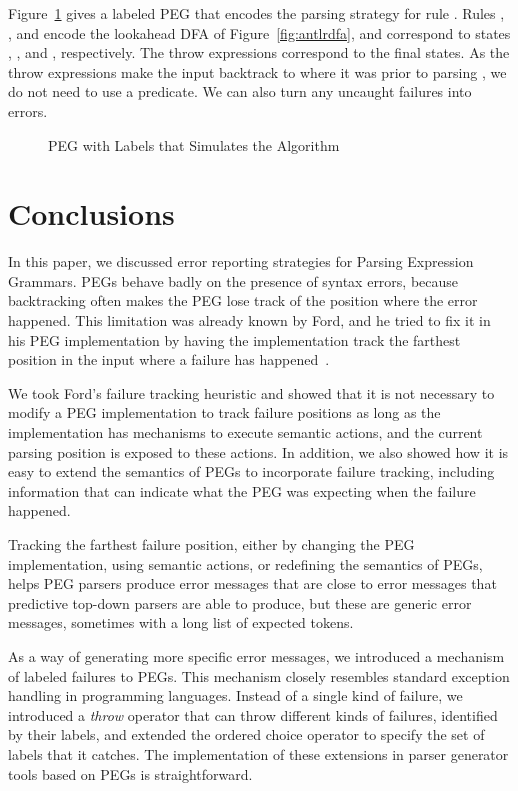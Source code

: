 \documentclass[3p,12pt,singlecolumn]{elsarticle}
\begin{document}
Figure~\ref{fig:pegllstar} gives a labeled PEG that encodes
the  parsing strategy for rule . Rules ,
, and  encode the lookahead DFA of Figure~\ref{fig:antlrdfa}, and correspond to states
, , and , respectively. The throw
expressions correspond to the final states.
As the throw expressions make the input backtrack to where
it was prior to parsing , we do not need to use a
predicate. We can also turn any uncaught failures into
errors.

\begin{figure}[t]

\caption{PEG with Labels that Simulates the  Algorithm}
\label{fig:pegllstar}
\end{figure}



\section{Conclusions} 
\label{sec:conc}

In this paper, we discussed error reporting strategies for
Parsing Expression Grammars. PEGs behave badly on the presence
of syntax errors, because backtracking often makes the PEG
lose track of the position where the error happened.
This limitation was already known by Ford, and he
tried to fix it in his PEG implementation by having
the implementation track the farthest position in the
input where a failure has happened~\cite{ford2002packrat}.

We took Ford's failure tracking heuristic and showed that
it is not necessary to modify a PEG implementation to
track failure positions as long as the implementation
has mechanisms to execute semantic actions, and the
current parsing position is exposed to these actions.
In addition, we also showed how it is easy to extend
the semantics of PEGs to incorporate failure tracking,
including information that can indicate what the
PEG was expecting when the failure happened.

Tracking the farthest failure position, either by
changing the PEG implementation, using semantic actions,
or redefining the semantics of PEGs, helps PEG parsers
produce error messages that are close to error messages
that predictive top-down parsers are able to produce,
but these are generic error messages, sometimes with
a long list of expected tokens.

As a way of generating more specific error messages,
we introduced a mechanism of labeled failures to PEGs.
This mechanism closely resembles standard exception
handling in programming languages. Instead of a
single kind of failure, we introduced a \emph{throw} operator
 that can throw different kinds of failures,
identified by their labels, and extended the ordered choice
operator to specify the set of labels that it catches.
The implementation of these extensions in parser generator
tools based on PEGs is straightforward.
\end{document}

